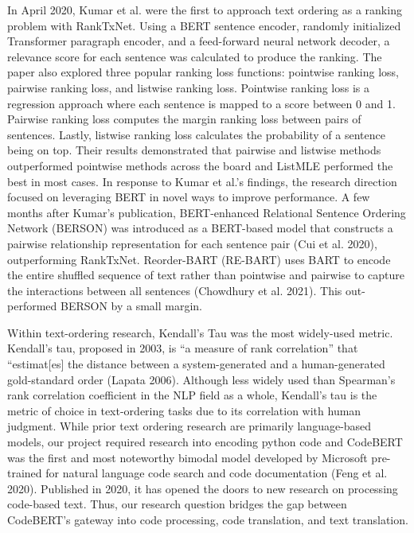 \documentclass[conference]{IEEEtran}
\begin{document}
In April 2020, Kumar et al. were the first to approach text ordering as a ranking problem with RankTxNet. Using a BERT sentence encoder, randomly initialized Transformer paragraph encoder, and a feed-forward neural network decoder, a relevance score for each sentence was calculated to produce the ranking. The paper also explored three popular ranking loss functions: pointwise ranking loss, pairwise ranking loss, and listwise ranking loss. Pointwise ranking loss is a regression approach where each sentence is mapped to a score between 0 and 1. Pairwise ranking loss computes the margin ranking loss between pairs of sentences. Lastly, listwise ranking loss calculates the probability of a sentence being on top. Their results demonstrated that pairwise and listwise methods outperformed pointwise methods across the board and ListMLE performed the best in most cases. In response to Kumar et al.’s findings, the research direction focused on leveraging BERT in novel ways to improve performance. A few months after Kumar’s publication, BERT-enhanced Relational Sentence Ordering Network (BERSON) was introduced as a BERT-based model that constructs a pairwise relationship representation for each sentence pair (Cui et al. 2020), outperforming RankTxNet. Reorder-BART (RE-BART) uses BART to encode the entire shuffled sequence of text rather than pointwise and pairwise to capture the interactions between all sentences (Chowdhury et al. 2021). This out-performed BERSON by a small margin.

Within text-ordering research, Kendall’s Tau was the most widely-used metric. Kendall’s tau, proposed in 2003, is “a measure of rank correlation” that “estimat[es] the distance between a system-generated and a human-generated gold-standard order (Lapata 2006). Although less widely used than Spearman’s rank correlation coefficient in the NLP field as a whole, Kendall’s tau is the metric of choice in text-ordering tasks due to its correlation with human judgment. While prior text ordering research are primarily language-based models, our project required research into encoding python code and CodeBERT was the first and most noteworthy bimodal model developed by Microsoft pre-trained for natural language code search and code documentation (Feng et al. 2020). Published in 2020, it has opened the doors to new research on processing code-based text. Thus, our research question bridges the gap between CodeBERT’s gateway into code processing, code translation, and text translation.
\end{document}
